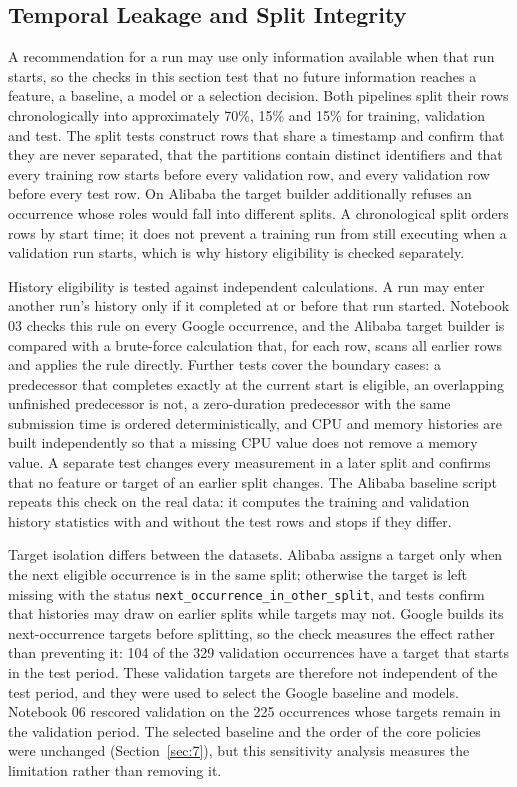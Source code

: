 \documentclass{IEEEtran}
\begin{document}
\subsection{Temporal Leakage and Split Integrity}\label{sec:6.2}

A recommendation for a run may use only information available when that run starts, so the checks in this section test that no future information reaches a feature, a baseline, a model or a selection decision. Both pipelines split their rows chronologically into approximately 70\%, 15\% and 15\% for training, validation and test. The split tests construct rows that share a timestamp and confirm that they are never separated, that the partitions contain distinct identifiers and that every training row starts before every validation row, and every validation row before every test row. On Alibaba the target builder additionally refuses an occurrence whose roles would fall into different splits. A chronological split orders rows by start time; it does not prevent a training run from still executing when a validation run starts, which is why history eligibility is checked separately.

History eligibility is tested against independent calculations. A run may enter another run's history only if it completed at or before that run started. Notebook 03 checks this rule on every Google occurrence, and the Alibaba target builder is compared with a brute-force calculation that, for each row, scans all earlier rows and applies the rule directly. Further tests cover the boundary cases: a predecessor that completes exactly at the current start is eligible, an overlapping unfinished predecessor is not, a zero-duration predecessor with the same submission time is ordered deterministically, and CPU and memory histories are built independently so that a missing CPU value does not remove a memory value. A separate test changes every measurement in a later split and confirms that no feature or target of an earlier split changes. The Alibaba baseline script repeats this check on the real data: it computes the training and validation history statistics with and without the test rows and stops if they differ.

Target isolation differs between the datasets. Alibaba assigns a target only when the next eligible occurrence is in the same split; otherwise the target is left missing with the status \texttt{next\_occurrence\_in\_other\_split}, and tests confirm that histories may draw on earlier splits while targets may not. Google builds its next-occurrence targets before splitting, so the check measures the effect rather than preventing it: 104 of the 329 validation occurrences have a target that starts in the test period. These validation targets are therefore not independent of the test period, and they were used to select the Google baseline and models. Notebook 06 rescored validation on the 225 occurrences whose targets remain in the validation period. The selected baseline and the order of the core policies were unchanged (Section~\ref{sec:7}), but this sensitivity analysis measures the limitation rather than removing it.
\end{document}

